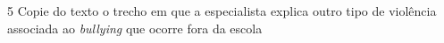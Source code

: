 \coment{%
}

\num{5} Copie do texto o trecho em que a especialista explica outro tipo de violência associada ao \textit{bullying} que ocorre fora da escola

